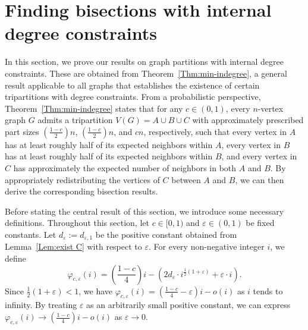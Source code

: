 \documentclass{aic}
\begin{document}
	
	\section{Finding bisections with internal degree constraints}\label{sec:int}
	\noindent In this section, we prove our results on graph partitions with internal degree constraints.
	These are obtained from Theorem~\ref{Thm:min-indegree}, a general result applicable to all graphs that establishes the existence of certain tripartitions with degree constraints.
	From a probabilistic perspective, Theorem~\ref{Thm:min-indegree} states that for any $c \in (0,1)$, every $n$-vertex graph $G$ admits a tripartition $V(G) = A \cup B \cup C$ with approximately prescribed part sizes $\left(\frac{1-c}{2}\right)n$, $\left(\frac{1-c}{2}\right)n$, and $cn$, respectively,
	such that every vertex in $A$ has at least roughly half of its expected neighbors within $A$,
	every vertex in $B$ has at least roughly half of its expected neighbors within $B$,
	and every vertex in $C$ has approximately the expected number of neighbors in both $A$ and $B$.
	By appropriately redistributing the vertices of $C$ between $A$ and $B$, we can then derive the corresponding bisection results.
	
	
	Before stating the central result of this section, we introduce some necessary definitions.
	Throughout this section, let $c\in [0,1)$ and $\varepsilon\in (0,1)$ be fixed constants.
	Let $d_\varepsilon:=d_{\varepsilon,1}$ be the positive constant obtained from Lemma~\ref{Lem:exist C} with respect to $\varepsilon$.
	For every non-negative integer $i$, we define
	\begin{equation}\label{equ:phi}
		\varphi_{c,\varepsilon}(i)=\left(\frac{1-c}{4}\right)i-\left(2d_\varepsilon\cdot i^{\frac{1}{2}(1+\varepsilon)}+\varepsilon\cdot i\right).
	\end{equation}
	Since $\frac{1}{2}(1+\varepsilon)<1$, we have $\varphi_{c,\varepsilon}(i)=\left(\frac{1-c}{4}-\varepsilon\right)i-o(i)$ as $i$ tends to infinity.
	By treating $\varepsilon$ as an arbitrarily small positive constant, we can express $\varphi_{c,\varepsilon}(i) \to \left(\frac{1-c}{4}\right)i - o(i)$ as $\varepsilon \to 0$.
	
\end{document}
